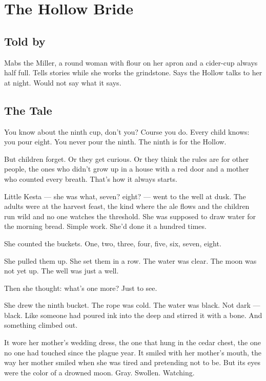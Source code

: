 \chapter{The Hollow Bride}

\section*{Told by}

Mabs the Miller, a round woman with flour on her apron and a cider-cup always half full. Tells stories while she works the grindstone. Says the Hollow talks to her at night. Would not say what it says.

\section*{The Tale}

You know about the ninth cup, don't you? Course you do. Every child knows: you pour eight. You never pour the ninth. The ninth is for the Hollow.

But children forget. Or they get curious. Or they think the rules are for other people, the ones who didn't grow up in a house with a red door and a mother who counted every breath. That's how it always starts.

Little Kesta --- she was what, seven? eight? --- went to the well at dusk. The adults were at the harvest feast, the kind where the ale flows and the children run wild and no one watches the threshold. She was supposed to draw water for the morning bread. Simple work. She'd done it a hundred times.

She counted the buckets. One, two, three, four, five, six, seven, eight.

She pulled them up. She set them in a row. The water was clear. The moon was not yet up. The well was just a well.

Then she thought: what's one more? Just to see.

She drew the ninth bucket. The rope was cold. The water was black. Not dark --- black. Like someone had poured ink into the deep and stirred it with a bone. And something climbed out.

It wore her mother's wedding dress, the one that hung in the cedar chest, the one no one had touched since the plague year. It smiled with her mother's mouth, the way her mother smiled when she was tired and pretending not to be. But its eyes were the color of a drowned moon. Gray. Swollen. Watching.


